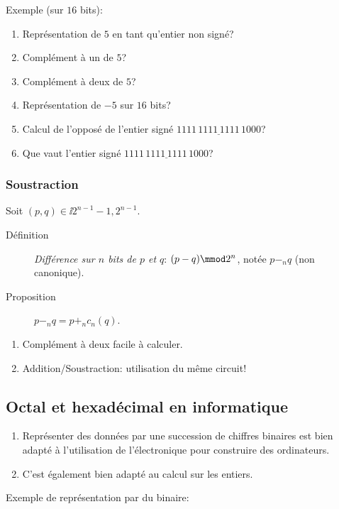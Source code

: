 Exemple (sur $16$ bits):
\begin{enumerate}
\item Représentation  de $5$ en tant qu'entier non signé?
\item Complément à un de $5$?
\item Complément à deux de $5$?
\item Représentation de $-5$ sur $16$ bits?
\item Calcul de l'opposé de l'entier signé $\underline{1111\,1111\,1111\,1000}$?
\item Que vaut l'entier signé $\underline{1111\,1111\,1111\,1000}$?
\end{enumerate}

\subsubsection*{Soustraction}

Soit $(p,q)\in\ii{2^{n-1}-1,2^{n-1}}$.
\begin{description}
\item[Définition] \emph{Différence sur $n$ bits de $p$ et $q$}: $(p-
  q)\mmod 2^{n}$, notée $p-_{n}q$ (non canonique).
\item[Proposition] $p -_{n} q = p +_{n} c_{n}(q)$.
\end{description}

\begin{enumerate}
\item Complément à deux facile à calculer.
\item Addition/Soustraction: utilisation du même circuit!
\end{enumerate}


\subsection*{Octal et hexadécimal en informatique}

\begin{enumerate}
\item Représenter des données par une succession de chiffres binaires
  est bien adapté à l'utilisation de l'électronique pour construire des
  ordinateurs.
\item C'est également bien adapté au calcul sur les entiers.
\end{enumerate}

Exemple de représentation par du binaire:

